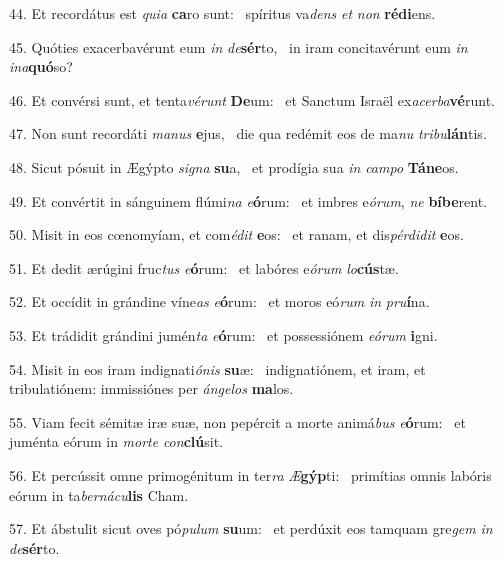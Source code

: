 44. Et recordátus est \textit{qui}\textit{a} \textbf{ca}ro sunt: \ast\  spíritus va\textit{dens} \textit{et} \textit{non} \textbf{réd}\textbf{i}ens.\

45. Quóties exacerbavérunt eum \textit{in} \textit{de}\textbf{sér}to, \ast\  in iram concitavérunt eum \textit{in} \textit{in}\textit{a}\textbf{quó}so?\

46. Et convérsi sunt, et tenta\textit{vé}\textit{runt} \textbf{De}um: \ast\  et Sanctum Israël ex\textit{a}\textit{cer}\textit{ba}\textbf{vé}runt.\

47. Non sunt recordáti \textit{ma}\textit{nus} \textbf{e}jus, \ast\  die qua redémit eos de ma\textit{nu} \textit{tri}\textit{bu}\textbf{lán}tis.\

48. Sicut pósuit in Ægýpto \textit{si}\textit{gna} \textbf{su}a, \ast\  et prodígia sua \textit{in} \textit{cam}\textit{po} \textbf{Tá}\textbf{ne}os.\

49. Et convértit in sánguinem flúmi\textit{na} \textit{e}\textbf{ó}rum: \ast\  et imbres e\textit{ó}\textit{rum}, \textit{ne} \textbf{bí}\textbf{be}rent.\

50. Misit in eos cœnomyíam, et com\textit{é}\textit{dit} \textbf{e}os: \ast\  et ranam, et dis\textit{pér}\textit{di}\textit{dit} \textbf{e}os.\

51. Et dedit ærúgini fruc\textit{tus} \textit{e}\textbf{ó}rum: \ast\  et labóres e\textit{ó}\textit{rum} \textit{lo}\textbf{cús}tæ.\

52. Et occídit in grándine víne\textit{as} \textit{e}\textbf{ó}rum: \ast\  et moros eó\textit{rum} \textit{in} \textit{pru}\textbf{í}na.\

53. Et trádidit grándini jumén\textit{ta} \textit{e}\textbf{ó}rum: \ast\  et possessiónem \textit{e}\textit{ó}\textit{rum} \textbf{i}gni.\

54. Misit in eos iram indignati\textit{ó}\textit{nis} \textbf{su}æ: \ast\  indignatiónem, et iram, et tribulatiónem: immissiónes per \textit{án}\textit{ge}\textit{los} \textbf{ma}los.\

55. Viam fecit sémitæ iræ suæ, non pepércit a morte animá\textit{bus} \textit{e}\textbf{ó}rum: \ast\  et juménta eórum in \textit{mor}\textit{te} \textit{con}\textbf{clú}sit.\

56. Et percússit omne primogénitum in ter\textit{ra} \textit{Æ}\textbf{gýp}ti: \ast\  primítias omnis labóris eórum in ta\textit{ber}\textit{ná}\textit{cu}\textbf{lis} Cham.\

57. Et ábstulit sicut oves pó\textit{pu}\textit{lum} \textbf{su}um: \ast\  et perdúxit eos tamquam gre\textit{gem} \textit{in} \textit{de}\textbf{sér}to.\

